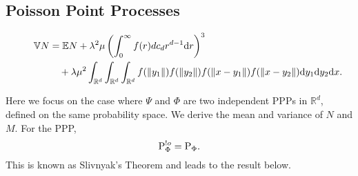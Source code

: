 \subsection{Poisson Point Processes}
\begin{figure*}[t]
\normalsize
\setcounter{MYtempeqncnt}{\value{equation}}
 \begin{align}
       \mathbb{V} N
       & = \Ex N+\lambda^2\mu\left(\int_{0}^{\infty}f(r)dc_d r^{d-1} \dd r\right)^3 \nonumber%
       \\
       &\quad+\lambda\mu^2 \int_{\mathbb{R}^d}\int_{\mathbb{R}^d}\int_{\mathbb{R}^d}f(\|y_1\|)f(\|y_2\|) f(\|x-y_1\|)f(\|x-y_2\|) \dd y_1\dd y_2\dd x.\label{eq: E_N_o^2}
    \end{align}
    \setcounter{equation}{\value{MYtempeqncnt}}
\hrulefill
\vspace*{4pt}
\end{figure*}
Here we focus on the case where $\Psi$ and $\Phi$ are two independent PPPs in $\mathbb{R}^d$, defined on the same probability space. We derive the mean and variance of $N$ and $M$. For the PPP,
\[
{\rm P}_{\Phi}^{!o} = \rm P_{\Phi}.
\]
This is known as Slivnyak's Theorem  \cite{haenggi2012stochastic} and leads to  the result below.

   

